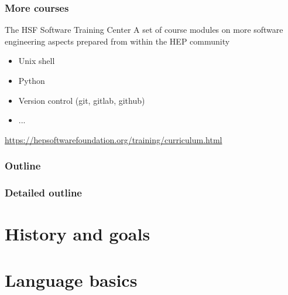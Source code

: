 \documentclass[compress]{beamer}
\begin{document}
\begin{frame}
  \frametitle{More courses}
  \begin{block}{The HSF Software Training Center}
    A set of course modules on more software engineering aspects prepared from within the HEP community
    \begin{itemize}
      \item Unix shell
      \item Python
      \item Version control (git, gitlab, github)
      \item ...
    \end{itemize}
    {\small \url{https://hepsoftwarefoundation.org/training/curriculum.html}}
  \end{block}

\end{frame}

\begin{frame}
  \frametitle{Outline}
  \begin{multicols}{2}
    \tableofcontents[sectionstyle=show,subsectionstyle=hide]
  \end{multicols}
\end{frame}

\begin{frame}
  \frametitle{Detailed outline}
  \begin{tiny}
    \begin{multicols}{3}
      \tableofcontents[sectionstyle=show,subsectionstyle=show]
    \end{multicols}
  \end{tiny}
\end{frame}

\section[Intro]{History and goals}



\section[base]{Language basics}










\begin{advanced}
  
  
\end{advanced}
\end{document}
